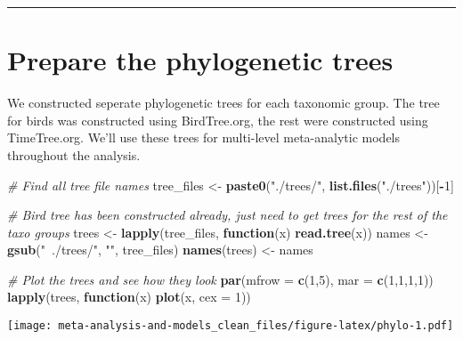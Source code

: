 \documentclass[]{article}
\newenvironment{Shaded}{\begin{snugshade}}{\end{snugshade}}
\newcommand{\KeywordTok}[1]{\textcolor[rgb]{0.13,0.29,0.53}{\textbf{#1}}}
\newcommand{\DataTypeTok}[1]{\textcolor[rgb]{0.13,0.29,0.53}{#1}}
\newcommand{\DecValTok}[1]{\textcolor[rgb]{0.00,0.00,0.81}{#1}}
\newcommand{\StringTok}[1]{\textcolor[rgb]{0.31,0.60,0.02}{#1}}
\newcommand{\CommentTok}[1]{\textcolor[rgb]{0.56,0.35,0.01}{\textit{#1}}}
\newcommand{\ControlFlowTok}[1]{\textcolor[rgb]{0.13,0.29,0.53}{\textbf{#1}}}
\newcommand{\OperatorTok}[1]{\textcolor[rgb]{0.81,0.36,0.00}{\textbf{#1}}}
\newcommand{\NormalTok}[1]{#1}
\begin{document}
\begin{center}\rule{0.5\linewidth}{0.5pt}\end{center}

\section{Prepare the phylogenetic
trees}\label{prepare-the-phylogenetic-trees}

We constructed seperate phylogenetic trees for each taxonomic group. The
tree for birds was constructed using BirdTree.org, the rest were
constructed using TimeTree.org. We'll use these trees for multi-level
meta-analytic models throughout the analysis.

\begin{Shaded}
\begin{Highlighting}[]
\CommentTok{# Find all tree file names}
\NormalTok{  tree_files <-}\StringTok{ }\KeywordTok{paste0}\NormalTok{(}\StringTok{"./trees/"}\NormalTok{, }\KeywordTok{list.files}\NormalTok{(}\StringTok{"./trees"}\NormalTok{))[}\OperatorTok{-}\DecValTok{1}\NormalTok{]}
  
    \CommentTok{# Bird tree has been constructed already, just need to get trees for the rest of the taxo groups   }
\NormalTok{      trees <-}\StringTok{ }\KeywordTok{lapply}\NormalTok{(tree_files, }\ControlFlowTok{function}\NormalTok{(x) }\KeywordTok{read.tree}\NormalTok{(x))}
\NormalTok{      names <-}\StringTok{ }\KeywordTok{gsub}\NormalTok{(}\StringTok{"~./trees/"}\NormalTok{, }\StringTok{""}\NormalTok{, tree_files)}
      \KeywordTok{names}\NormalTok{(trees) <-}\StringTok{ }\NormalTok{names}

    \CommentTok{# Plot the trees and see how they look}
      \KeywordTok{par}\NormalTok{(}\DataTypeTok{mfrow =} \KeywordTok{c}\NormalTok{(}\DecValTok{1}\NormalTok{,}\DecValTok{5}\NormalTok{), }\DataTypeTok{mar =} \KeywordTok{c}\NormalTok{(}\DecValTok{1}\NormalTok{,}\DecValTok{1}\NormalTok{,}\DecValTok{1}\NormalTok{,}\DecValTok{1}\NormalTok{))}
      \KeywordTok{lapply}\NormalTok{(trees, }\ControlFlowTok{function}\NormalTok{(x) }\KeywordTok{plot}\NormalTok{(x, }\DataTypeTok{cex =} \DecValTok{1}\NormalTok{))}
\end{Highlighting}
\end{Shaded}

\texttt{[image: meta-analysis-and-models\_clean\_files/figure-latex/phylo-1.pdf]}
\end{document}
